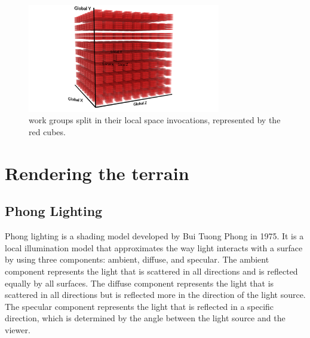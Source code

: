 \documentclass{report}
\begin{document}
\begin{figure}[h!]
	\centering
	\includegraphics[width=0.75\textwidth]{img/work_groups.png}
	\caption{work groups split in their local space invocations, represented by the red cubes.}
	\label{fig:work_groups}
\end{figure}

\chapter{Rendering the terrain}
\label{ch:rendering-the-terrain}
\section{Phong Lighting}

Phong lighting is a shading model developed by Bui Tuong Phong in 1975. It is a local illumination
model that approximates the way light interacts with a surface by using three components: ambient,
diffuse, and specular. The ambient component represents the light that is scattered in all
directions and is reflected equally by all surfaces. The diffuse component represents the light
that is scattered in all directions but is reflected more in the direction of the light source. The
specular component represents the light that is reflected in a specific direction, which is
determined by the angle between the light source and the viewer.

\end{document}
